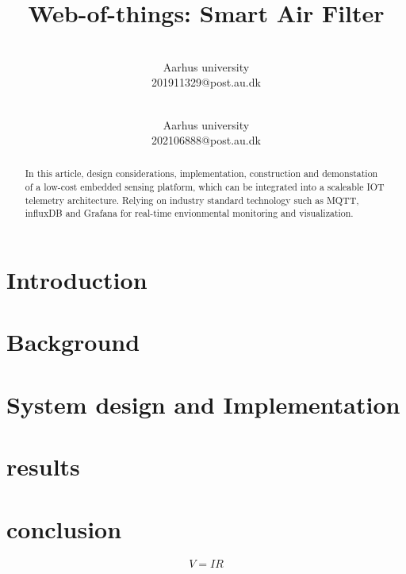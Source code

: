 \documentclass[conference]{IEEEtran}
\title{Web-of-things: Smart Air Filter}
\author{
    \makebox[.5\linewidth]{Alexander Thomsen}\\Aarhus university\\201911329@post.au.dk\\
    \and \makebox[.5\linewidth]{Jeppe Bangshaab}\\Aarhus university\\202106888@post.au.dk\\

    
}
\begin{document}


\maketitle

\begin{abstract}
In this article, design considerations, implementation, construction and demonstation 
of a low-cost embedded sensing platform, which can be integrated into a scaleable IOT
telemetry architecture. Relying on industry standard technology such as MQTT, influxDB and 
Grafana for real-time envionmental monitoring and visualization.  
\end{abstract}

\section{Introduction}



\section{Background}


\section{System design and Implementation}


\section{results}

\section{conclusion}




\[
V = IR
\]









\end{document}

